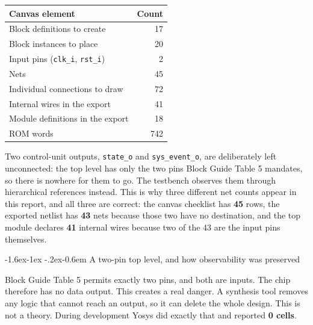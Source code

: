 \documentclass[11pt,a4paper]{article}
\makeatletter
\renewcommand\subsubsection{\@startsection{subsubsection}{3}{\z@}%
  {-1.6ex\@plus -1ex \@minus -.2ex}{-0.6em}%
  {\color{rvbldark}\normalfont\normalsize\bfseries}}
\newcommand{\hdr}[1]{\textbf{#1}}
\newcommand{\hrow}{\rowcolor{rvbltint}}
\makeatother
\begin{document}
\begin{minipage}[t]{0.44\linewidth}
\vspace{0pt}
\centering\small
{}
\label{tab:canvas}
\begin{tabularx}{\linewidth}{Xr}
\toprule
\hrow \hdr{Canvas element} & \hdr{Count} \\
\midrule
Block definitions to create   & 17 \\
Block instances to place      & 20 \\
Input pins (\texttt{clk\_i}, \texttt{rst\_i}) & 2 \\
Nets                          & 45 \\
Individual connections to draw & 72 \\
\midrule
Internal wires in the export  & 41 \\
Module definitions in the export & 18 \\
ROM words                     & 742 \\
\bottomrule
\end{tabularx}
\vspace{4pt}
{\scriptsize Two control-unit outputs, \texttt{state\_o} and \texttt{sys\_event\_o}, are
deliberately left unconnected: the top level has only the two pins Block Guide Table 5
mandates, so there is nowhere for them to go. The testbench observes them through
hierarchical references instead. This is why three different net counts appear in this
report, and all three are correct: the canvas checklist has \textbf{45} rows, the exported
netlist has \textbf{43} nets because those two have no destination, and the top module
declares \textbf{41} internal wires because two of the 43 are the input pins themselves.}
\end{minipage}

\subsubsection{A two-pin top level, and how observability was preserved}
\label{sec:observability}

Block Guide Table 5 permits exactly two pins, and both are inputs. The chip therefore has
no data output. This creates a real danger. A synthesis tool removes any logic that cannot
reach an output, so it can delete the whole design. This is not a theory. During development
Yosys did exactly that and reported \textbf{0 cells}.
\end{document}
